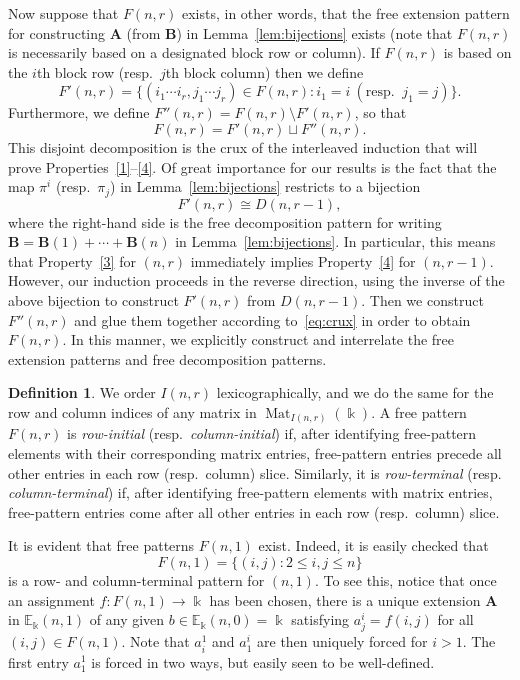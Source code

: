 \documentclass[10pt]{article}
\theoremstyle{definition}
\newtheorem{defi}[theorem]{Definition}
\providecommand{\resp}{resp.\ }
\DeclareMathOperator{\Mat}{Mat}
\newcommand{\E}{\mathbb{E}}
\newcommand{\bA}{\mathbf{A}}
\newcommand{\bB}{\mathbf{B}}
\begin{document}
Now suppose that $F(n,r)$ exists, in other words, that the free
extension pattern for constructing $\bA$ (from $\bB$) in Lemma~\ref{lem:bijections} exists (note that $F(n,r)$ is necessarily based on a designated block row or column). If $F(n,r)$ is based on the
$i$th block row (\resp $j$th block column) then we define 
\begin{equation}\label{eq:F'-def}
 F'(n,r) = \{(i_1 \cdots i_r, j_1 \cdots j_r) \in F(n,r):
 i_1 = i\ (\text{\resp}\ j_1 = j)\}.
\end{equation}
Furthermore, we define $F''(n,r)=F(n,r) \setminus F'(n,r)$, so that
\begin{equation}\label{eq:crux}
F(n,r) = F'(n,r) \sqcup F''(n,r).
\end{equation}
This disjoint decomposition is the crux of the interleaved induction
that will prove Properties~\ref{1}--\ref{4}. Of great importance for
our results is the fact that the map $\pi^i$ (\resp $\pi_j$) in Lemma~\ref{lem:bijections} restricts to a bijection
\[
F'(n,r)\cong D(n,r-1),
\]
where the right-hand side is the free decomposition pattern for writing
$\bB = \bB(1)+ \cdots + \bB(n)$ in Lemma~\ref{lem:bijections}. In
particular, this means that Property~\ref{3} for $(n,r)$ immediately
implies Property~\ref{4} for $(n,r-1)$. However, our induction
proceeds in the reverse direction, using the inverse of the above
bijection to construct $F'(n,r)$ from $D(n,r-1)$. Then we construct
$F''(n,r)$ and glue them together according to~\eqref{eq:crux} in
order to obtain $F(n,r)$. In this manner, we explicitly construct and
interrelate the free extension patterns and free decomposition
patterns.


\begin{defi}
We order $I(n,r)$ lexicographically, and we do the same
for the row and column indices of any matrix in
$\Mat_{I(n,r)}(\Bbbk)$. A free pattern $F(n,r)$ is \emph{row-initial}
(\resp \emph{column-initial}) if, after identifying free-pattern
elements with their corresponding matrix entries, free-pattern entries
precede all other entries in each row (\resp column)
slice. Similarly, it is \emph{row-terminal} (\resp
\emph{column-terminal}) if, after identifying free-pattern elements
with matrix entries, free-pattern entries come after all other entries
in each row (\resp column) slice.
\end{defi}

It is evident that free patterns $F(n,1)$ exist. Indeed, it is easily
checked that
\[
F(n,1) = \{(i,j): 2 \le i,j \le n\}
\]
is a row- and column-terminal pattern for $(n,1)$. To see this,
notice that once an assignment $f:F(n,1) \to \Bbbk$ has been chosen,
there is a unique extension $\bA$ in $\E_\Bbbk(n,1)$ of any given $b
\in \E_\Bbbk(n,0) = \Bbbk$ satisfying $a^i_j = f(i,j)$ for all $(i,j)
\in F(n,1)$. Note that $a^1_i$ and $a^i_1$ are then uniquely forced
for $ i>1 $. The first entry $a^1_1$ is forced in two ways, but
easily seen to be well-defined.
\end{document}
